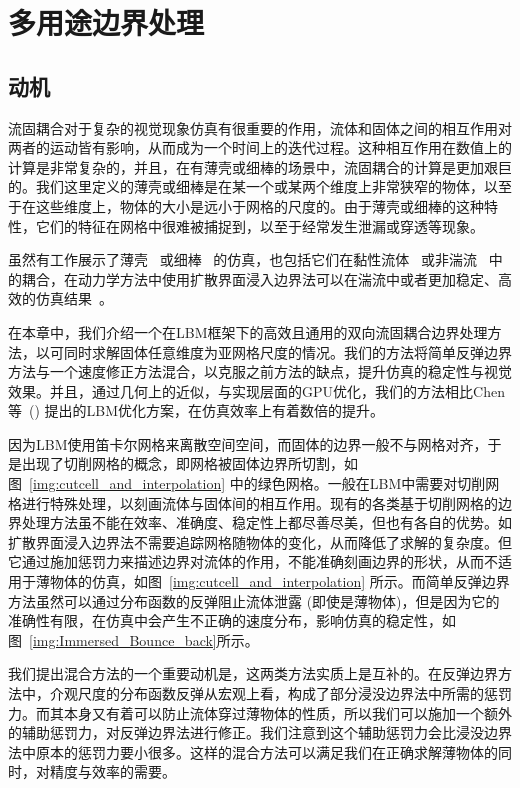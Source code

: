 \chapter{多用途边界处理}
\label{sec:siga21}

\section{动机}
流固耦合对于复杂的视觉现象仿真有很重要的作用，流体和固体之间的相互作用对两者的运动皆有影响，从而成为一个时间上的迭代过程。这种相互作用在数值上的计算是非常复杂的，并且，在有薄壳或细棒的场景中，流固耦合的计算是更加艰巨的。我们这里定义的薄壳或细棒是在某一个或某两个维度上非常狭窄的物体，以至于在这些维度上，物体的大小是远小于网格的尺度的。由于薄壳或细棒的这种特性，它们的特征在网格中很难被捕捉到，以至于经常发生泄漏或穿透等现象。

虽然有工作展示了薄壳~\cite{DiscreteShells,Bridson:2003} 或细棒~\cite{DiscreteRods} 的仿真，也包括它们在黏性流体~\cite{Fei-2018,Takahashi:2019,Fei-2019} 或非湍流~\cite{Azevedo-2016} 中的耦合，在动力学方法中使用扩散界面浸入边界法可以在湍流中或者更加稳定、高效的仿真结果~\cite{Li-2018,Li-2020}。

在本章中，我们介绍一个在LBM框架下的高效且通用的双向流固耦合边界处理方法，以可同时求解固体任意维度为亚网格尺度的情况。我们的方法将简单反弹边界方法与一个速度修正方法混合，以克服之前方法的缺点，提升仿真的稳定性与视觉效果。并且，通过几何上的近似，与实现层面的GPU优化，我们的方法相比Chen等~(\citeyear{Chen-2021}) 提出的LBM优化方案，在仿真效率上有着数倍的提升。

因为LBM使用笛卡尔网格来离散空间空间，而固体的边界一般不与网格对齐，于是出现了切削网格的概念，即网格被固体边界所切割，如图~\ref{img:cutcell_and_interpolation} 中的绿色网格。一般在LBM中需要对切削网格进行特殊处理，以刻画流体与固体间的相互作用。现有的各类基于切削网格的边界处理方法虽不能在效率、准确度、稳定性上都尽善尽美，但也有各自的优势。如扩散界面浸入边界法不需要追踪网格随物体的变化，从而降低了求解的复杂度。但它通过施加惩罚力来描述边界对流体的作用，不能准确刻画边界的形状，从而不适用于薄物体的仿真，如图~\ref{img:cutcell_and_interpolation} 所示。而简单反弹边界方法虽然可以通过分布函数的反弹阻止流体泄露 (即使是薄物体)，但是因为它的准确性有限，在仿真中会产生不正确的速度分布，影响仿真的稳定性，如图~\ref{img:Immersed_Bounce_back}所示。

我们提出混合方法的一个重要动机是，这两类方法实质上是互补的。在反弹边界方法中，介观尺度的分布函数反弹从宏观上看，构成了部分浸没边界法中所需的惩罚力。而其本身又有着可以防止流体穿过薄物体的性质，所以我们可以施加一个额外的辅助惩罚力，对反弹边界法进行修正。我们注意到这个辅助惩罚力会比浸没边界法中原本的惩罚力要小很多。这样的混合方法可以满足我们在正确求解薄物体的同时，对精度与效率的需要。


